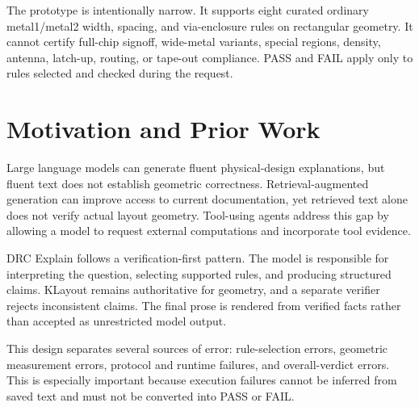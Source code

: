 \documentclass[10pt,twocolumn]{article}
\begin{document}
The prototype is intentionally narrow. It supports eight curated ordinary
metal1/metal2 width, spacing, and via-enclosure rules on rectangular geometry.
It cannot certify full-chip signoff, wide-metal variants, special regions,
density, antenna, latch-up, routing, or tape-out compliance. PASS and FAIL apply
only to rules selected and checked during the request.

\section{Motivation and Prior Work}
Large language models can generate fluent physical-design explanations, but fluent
text does not establish geometric correctness. Retrieval-augmented generation can
improve access to current documentation, yet retrieved text alone does not verify
actual layout geometry. Tool-using agents address this gap by allowing a model to
request external computations and incorporate tool evidence.

DRC Explain follows a verification-first pattern. The model is responsible for
interpreting the question, selecting supported rules, and producing structured
claims. KLayout remains authoritative for geometry, and a separate verifier
rejects inconsistent claims. The final prose is rendered from verified facts rather
than accepted as unrestricted model output.

This design separates several sources of error: rule-selection errors, geometric
measurement errors, protocol and runtime failures, and overall-verdict errors.
This is especially important because execution failures cannot be inferred from
saved text and must not be converted into PASS or FAIL.

\clearpage
\end{document}
